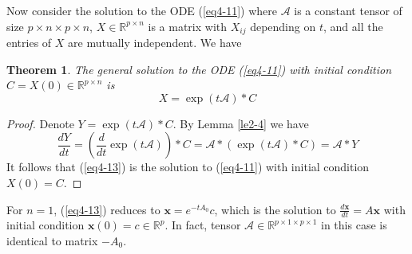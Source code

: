 \documentclass[11pt, oneside]{article}  %
\newtheorem{thm}{Theorem}[section]
\newtheorem{exm}[thm]{Example}
\newcommand{\p}{\prime}
\newcommand{\RR}{\mathbb{R}}
\newcommand{\TT}{\mathbb{T}}
\newcommand{\A}{\mathcal{A}}
\newcommand{\bx}{\textbf{x}}
\newcommand{\beq}{\begin{equation}}
\newcommand{\eeq}{\end{equation}}
\begin{document}

Now consider the solution to the ODE (\ref{eq4-11}) where $\A$ is a constant tensor of size $p\times n\times p\times n$, $X\in\RR^{p\times n}$ is 
a matrix with $X_{ij}$ depending on $t$, and all the entries of $X$ are mutually independent.  We have 
\begin{thm}\label{th4-3}
The general solution to the ODE (\ref{eq4-11}) with initial condition $C=X(0)\in\RR^{p\times n}$ is 
\beq\label{eq4-13}
X = \exp(t\A)\ast C  
\eeq
\end{thm}
\begin{proof}
Denote $Y= \exp(t\A)\ast C$.  By Lemma \ref{le2-4} we have 
\[
\frac{d Y}{dt}= \left(\frac{d}{dt} \exp(t\A)\right)\ast C =\A\ast \left(\exp(t\A)\ast C\right) =\A\ast Y   
\]
It follows that (\ref{eq4-13}) is the solution to (\ref{eq4-11})  with initial condition $X(0)=C$.  
\end{proof}

For $n=1$, (\ref{eq4-13}) reduces to $\bx=e^{-tA_{0}}c$, which is the solution to $\frac{d\bx}{dt}=A\bx$ with initial condition 
$\bx(0)=c\in\RR^{p}$. In fact, tensor $\A\in\RR^{p\times 1\times p\times 1}$ in this case is identical to matrix $-A_{0}$.  

% 
 
\end{document}
